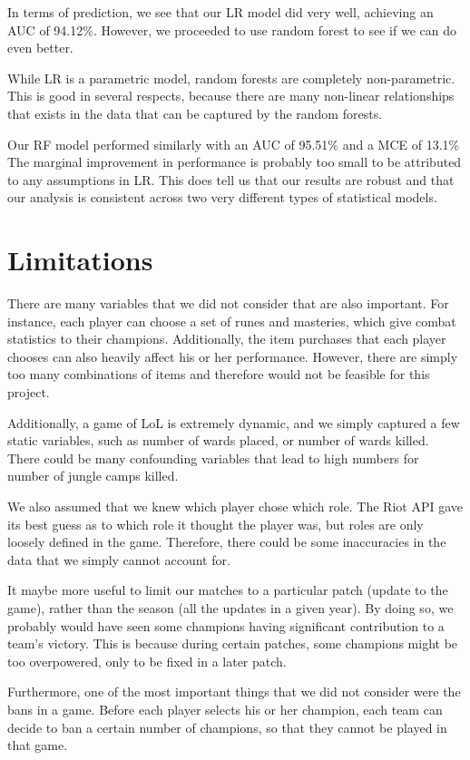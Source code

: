 \documentclass[runningheads]{llncs}
\begin{document}
	In terms of prediction, we see that our LR model did very well, achieving an AUC of 94.12\%. However, we proceeded to use random forest to see if we can do even better.

	While LR is a parametric model, random forests are completely non-parametric. This is good in several respects, because there are many non-linear relationships that exists in the data that can be captured by the random forests.

	Our RF model performed similarly with an AUC of 95.51\% and a MCE of 13.1\% The marginal improvement in performance is probably too small to be attributed to any assumptions in LR. This does tell us that our results are robust and that our analysis is consistent across two very different types of statistical models.
	
	\section{Limitations}
	
	There are many variables that we did not consider that are also important. For instance, each player can choose a set of runes and masteries, which give combat statistics to their champions. Additionally, the item purchases that each player chooses can also heavily affect his or her performance. However, there are simply too many combinations of items and therefore would not be feasible for this project.

	Additionally, a game of LoL is extremely dynamic, and we simply captured a few static variables, such as number of wards placed, or number of wards killed. There could be many confounding variables that lead to high numbers for number of jungle camps killed. 

	We also assumed that we knew which player chose which role. The Riot API gave its best guess as to which role it thought the player was, but roles are only loosely defined in the game. Therefore, there could be some inaccuracies in the data that we simply cannot account for. 

	It maybe more useful to limit our matches to a particular patch (update to the game), rather than the season (all the updates in a given year). By doing so, we probably would have seen some champions having significant contribution to a team’s victory. This is because during certain patches, some champions might be too overpowered, only to be fixed in a later patch.

	Furthermore, one of the most important things that we did not consider were the bans in a game. Before each player selects his or her champion, each team can decide to ban a certain number of champions, so that they cannot be played in that game.
\end{document}
